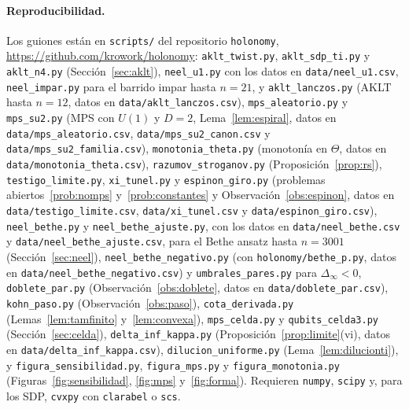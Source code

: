 \documentclass[11pt,a4paper]{article}
\theoremstyle{remark}
\begin{document}
\begin{sloppypar}
\paragraph{Reproducibilidad.} Los guiones están en \texttt{scripts/} del repositorio
\texttt{holonomy}, \url{https://github.com/krowork/holonomy}: \texttt{aklt\_twist.py}, \texttt{aklt\_sdp\_ti.py} y \texttt{aklt\_n4.py} (Sección~\ref{sec:aklt}), \texttt{neel\_u1.py} con los
datos en \texttt{data/neel\_u1.csv}, \texttt{neel\_impar.py} para el barrido impar hasta $n=21$, y
\texttt{aklt\_lanczos.py} (AKLT hasta $n=12$, datos en \texttt{data/aklt\_lanczos.csv}),
\texttt{mps\_aleatorio.py} y \texttt{mps\_su2.py} (MPS con $U(1)$ y $D=2$, Lema~\ref{lem:espiral},
datos en \texttt{data/mps\_aleatorio.csv}, \texttt{data/mps\_su2\_canon.csv} y
\texttt{data/mps\_su2\_familia.csv}),
\texttt{monotonia\_theta.py} (monotonía en $\Theta$, datos en \texttt{data/monotonia\_theta.csv}),
\texttt{razumov\_stroganov.py} (Proposición~\ref{prop:rs}),
\texttt{testigo\_limite.py}, \texttt{xi\_tunel.py} y \texttt{espinon\_giro.py} (problemas abiertos~\ref{prob:nomps} y~\ref{prob:constantes} y Observación~\ref{obs:espinon}, datos en
\texttt{data/testigo\_limite.csv}, \texttt{data/xi\_tunel.csv} y \texttt{data/espinon\_giro.csv}),
\texttt{neel\_bethe.py} y \texttt{neel\_bethe\_ajuste.py}, con los datos en
\texttt{data/neel\_bethe.csv} y \texttt{data/neel\_bethe\_ajuste.csv}, para el Bethe ansatz hasta
$n=3001$ (Sección~\ref{sec:neel}), \texttt{neel\_bethe\_negativo.py} (con
\texttt{holonomy/bethe\_p.py}, datos en \texttt{data/neel\_bethe\_negativo.csv}) y
\texttt{umbrales\_pares.py} para $\Delta_\infty<0$, \texttt{doblete\_par.py} (Observación~\ref{obs:doblete},
datos en \texttt{data/doblete\_par.csv}), \texttt{kohn\_paso.py} (Observación~\ref{obs:paso}), \texttt{cota\_derivada.py}
(Lemas~\ref{lem:tamfinito} y~\ref{lem:convexa}), \texttt{mps\_celda.py} y
\texttt{qubits\_celda3.py} (Sección~\ref{sec:celda}), \texttt{delta\_inf\_kappa.py}
(Proposición~\ref{prop:limite}(vi), datos en \texttt{data/delta\_inf\_kappa.csv}), \texttt{dilucion\_uniforme.py}
(Lema~\ref{lem:dilucionti}), y \texttt{figura\_sensibilidad.py}, \texttt{figura\_mps.py} y \texttt{figura\_monotonia.py}
(Figuras~\ref{fig:sensibilidad}, \ref{fig:mps} y~\ref{fig:forma}). Requieren \texttt{numpy}, \texttt{scipy} y,
para los SDP, \texttt{cvxpy} con \texttt{clarabel} o \texttt{scs}.
\end{sloppypar}
\end{document}
